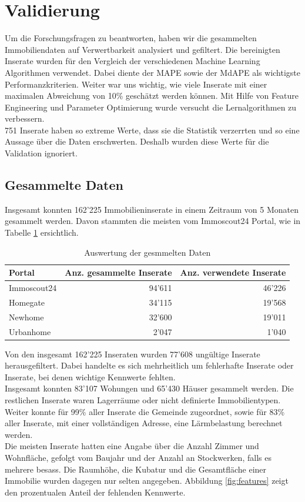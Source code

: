 \section{Validierung}
Um die Forschungsfragen zu beantworten, haben wir die gesammelten Immobiliendaten auf Verwertbarkeit analysiert und gefiltert. Die bereinigten Inserate wurden für den Vergleich der verschiedenen Machine Learning Algorithmen verwendet. Dabei diente der MAPE sowie der MdAPE als wichtigste Performanzkriterien. Weiter war uns wichtig, wie viele Inserate mit einer maximalen Abweichung von 10\% geschätzt werden können. Mit Hilfe von Feature Engineering und Parameter Optimierung wurde versucht die Lernalgorithmen zu verbessern.\\
751 Inserate haben so extreme Werte, dass sie die Statistik verzerrten und so eine Aussage über die Daten erschwerten. Deshalb wurden diese Werte für die Validation ignoriert.

\subsection{Gesammelte Daten}
Insgesamt konnten 162’225 Immobilieninserate in einem Zeitraum von 5 Monaten gesammelt werden. Davon stammten die meisten vom Immoscout24 Portal, wie in Tabelle \ref{tab:crawled_data} ersichtlich.

\begin{table}[ht]
\centering
{}
\begin{tabular}{@{}lrr@{}}
\toprule
Portal &  Anz. gesammelte Inserate & Anz. verwendete Inserate \\
\midrule
Immoscout24 & 94'611 & 46'226\\
Homegate & 34'115 & 19'568\\
Newhome & 32'600 & 19'011\\
Urbanhome & 2'047 & 1'040\\
\bottomrule
\end{tabular}
\caption{Auswertung der gesmmelten Daten}
\label{tab:crawled_data}
\end{table}

Von den insgesamt 162’225 Inseraten wurden 77’608 ungültige Inserate herausgefiltert.
Dabei handelte es sich mehrheitlich um fehlerhafte Inserate oder Inserate, bei denen wichtige Kennwerte fehlten.\\
Insgesamt konnten 83’107 Wohungen und 65’430 Häuser gesammelt werden. Die restlichen Inserate waren Lagerräume oder nicht definierte Immobilien\-typen.\\
Weiter konnte für 99\% aller Inserate die Gemeinde zugeordnet, sowie für 83\% aller Inserate, mit einer vollständigen Adresse, eine Lärmbelastung berechnet werden.\\
Die meisten Inserate hatten eine Angabe über die Anzahl Zimmer und Wohnfläche, gefolgt vom Baujahr und der Anzahl an Stockwerken, falls es mehrere besass. Die Raumhöhe, die Kubatur und die Gesamtfläche einer Immobilie wurden dagegen nur selten angegeben. Abbildung \ref{fig:features} zeigt den prozentualen Anteil der fehlenden Kennwerte.

